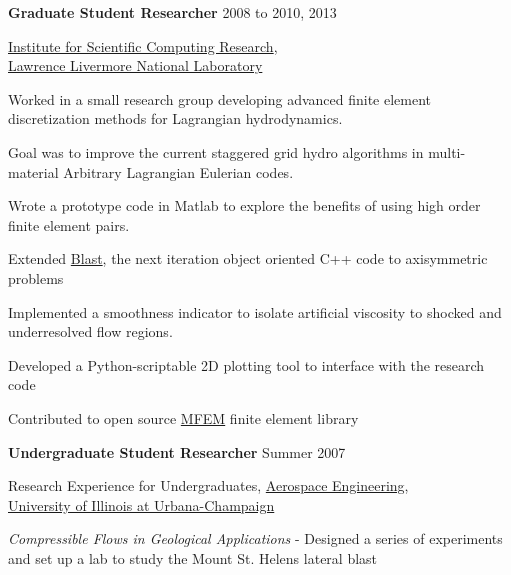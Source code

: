 \documentclass[10pt]{article}
\newenvironment{innerlist}[1][\enskip\textbullet]%
        {\begin{compactitem}[#1]}{\end{compactitem}}
\begin{document}
\textbf{Graduate Student Researcher} \hfill {2008 to 2010, 2013}
\begin{innerlist}

\item[] \href{http://iscr.llnl.gov/}{Institute for Scientific Computing Research},\\
        \href{http://www.llnl.gov/}{Lawrence Livermore National Laboratory}
\begin{innerlist}
\item Worked in a small research group developing advanced finite element discretization methods for Lagrangian hydrodynamics.
\item Goal was to improve the current staggered grid hydro algorithms in multi-material Arbitrary Lagrangian Eulerian codes.
\item Wrote a prototype code in Matlab to explore the benefits of using high order finite element pairs.
\item Extended \href{https://computation.llnl.gov/casc/blast/blast.html}{Blast}, the next iteration object oriented C++ code to axisymmetric problems
\item Implemented a smoothness indicator to isolate artificial viscosity to shocked and underresolved flow regions.
\item Developed a Python-scriptable 2D plotting tool to interface with the research code
\item Contributed to open source \href{http://code.google.com/p/mfem/}{MFEM} finite element library
\end{innerlist}
\end{innerlist}

\bigskip

\textbf{Undergraduate Student Researcher} \hfill {Summer 2007}
\begin{innerlist}

\item[] {Research Experience for Undergraduates},
        \href{http://www.ae.uiuc.edu/}{Aerospace Engineering},\\
        \href{http://www.uiuc.edu/}{University of Illinois at Urbana-Champaign}
\begin{innerlist}
\item \emph{Compressible Flows in Geological Applications} - Designed a series of experiments and set up a lab to study the Mount St. Helens lateral blast
\end{innerlist}
\end{innerlist}
\end{document}
